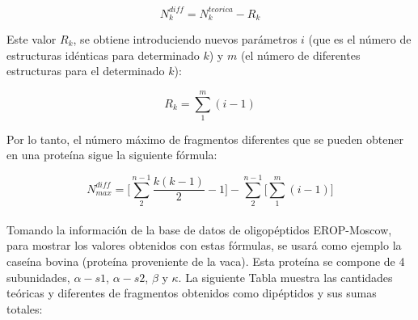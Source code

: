\begin{equation}
N_{k}^{diff}=N_{k}^{teorica}- R_{k}
\end{equation}

Este valor $R_{k}$, se obtiene introduciendo nuevos parámetros $i$ (que es el número de estructuras idénticas para determinado $k$) y $m$ (el número de diferentes estructuras para el determinado $k$):

\begin{equation}
R_{k}=\sum_{1}^{m}(i-1)
\end{equation}

Por lo tanto, el número máximo de fragmentos diferentes que se pueden obtener en una proteína sigue la siguiente fórmula:

\begin{equation}
N_{max}^{diff}=\Bigg[\sum_{2}^{n-1} \frac{k(k-1)}{2}-1\Bigg]- \sum_{2}^{n-1}\Bigg[\sum_{1}^{m}(i-1)\Bigg]
\end{equation}
\\
Tomando la información de la base de datos de oligopéptidos EROP-Moscow, para mostrar los valores obtenidos con estas fórmulas, se usará como ejemplo la caseína bovina (proteína proveniente de la vaca). Esta proteína se compone de 4 subunidades, $\alpha - s1$, $\alpha -s2$, $\beta$ y $\kappa$. La siguiente Tabla muestra las cantidades teóricas y diferentes de fragmentos obtenidos como dipéptidos y sus sumas totales:

